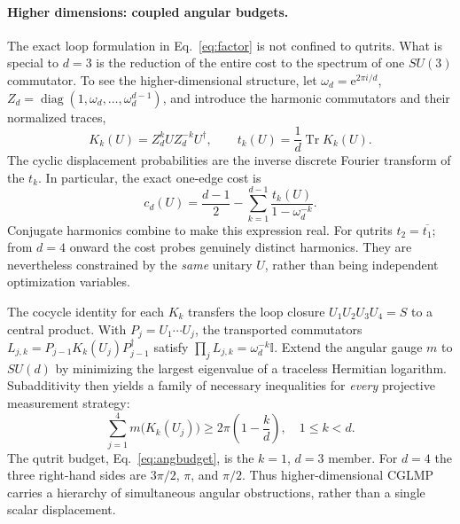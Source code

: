 \documentclass[aps,prl,reprint,superscriptaddress,nofootinbib]{revtex4-2}
\newcommand{\Tr}{\operatorname{Tr}}
\newcommand{\diag}{\operatorname{diag}}
\newcommand{\e}{\mathrm{e}}
\newcommand{\id}{\mathbb{I}}
\begin{document}
\paragraph{Higher dimensions: coupled angular budgets.}
The exact loop formulation in Eq.~\eqref{eq:factor} is not confined to qutrits. What is special to $d=3$ is the reduction of the entire cost to the spectrum of one $SU(3)$ commutator. To see the higher-dimensional structure, let $\omega_d=\e^{2\pi i/d}$, $Z_d=\diag(1,\omega_d,\ldots,\omega_d^{d-1})$, and introduce the harmonic commutators and their normalized traces,
\begin{equation}
K_k(U)=Z_d^kUZ_d^{-k}U^\dagger,\qquad
 t_k(U)=\frac{1}{d}\Tr K_k(U).
\label{eq:Kkmain}
\end{equation}
The cyclic displacement probabilities are the inverse discrete Fourier transform of the $t_k$. In particular, the exact one-edge cost is
\begin{equation}
c_d(U)=\frac{d-1}{2}-\sum_{k=1}^{d-1}
\frac{t_k(U)}{1-\omega_d^{-k}}.
\label{eq:costharmmain}
\end{equation}
Conjugate harmonics combine to make this expression real. For qutrits $t_2=\overline{t_1}$; from $d=4$ onward the cost probes genuinely distinct harmonics. They are nevertheless constrained by the \emph{same} unitary $U$, rather than being independent optimization variables.

The cocycle identity for each $K_k$ transfers the loop closure $U_1U_2U_3U_4=S$ to a central product. With $P_j=U_1\cdots U_j$, the transported commutators $L_{j,k}=P_{j-1}K_k(U_j)P_{j-1}^\dagger$ satisfy $\prod_jL_{j,k}=\omega_d^{-k}\id$. Extend the angular gauge $m$ to $SU(d)$ by minimizing the largest eigenvalue of a traceless Hermitian logarithm. Subadditivity then yields a family of necessary inequalities for \emph{every} projective measurement strategy:
\begin{equation}
\sum_{j=1}^{4}m\bigl(K_k(U_j)\bigr)
\geq 2\pi\left(1-\frac{k}{d}\right),\quad 1\leq k<d.
\label{eq:budgetdmain}
\end{equation}
The qutrit budget, Eq.~\eqref{eq:angbudget}, is the $k=1$, $d=3$ member. For $d=4$ the three right-hand sides are $3\pi/2$, $\pi$, and $\pi/2$. Thus higher-dimensional CGLMP carries a hierarchy of simultaneous angular obstructions, rather than a single scalar displacement.
\end{document}
